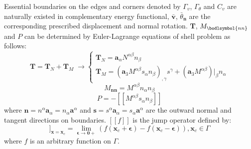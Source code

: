 Essential boundaries on the edges and corners denoted by $\Gamma_v$, $\Gamma_\theta$ and $C_v$ are naturally existed in complementary energy functional, $\bar{\boldsymbol v}$, $\bar \theta_{\boldsymbol n}$ are the corresponding prescribed displacement and normal rotation. $\boldsymbol T$, $M_{\bodlsymbol{nn}}$ and $P$ can be determined by Euler-Lagrange equations of shell problem \cite{benzaken2021} as follows:
\begin{equation}
\boldsymbol T = \boldsymbol T_N + \boldsymbol T_M \; \rightarrow
\begin{cases}
\boldsymbol T_N = \boldsymbol a_\alpha N^{\alpha\beta}n_\beta \\
\boldsymbol T_M = (\boldsymbol a_3 M^{\alpha\beta}s_\alpha n_\beta)_{,\gamma} s^\gamma
+ (\boldsymbol a_3 M^{\alpha\beta})\vert_\beta n_\alpha
\end{cases}
\end{equation}
\begin{equation}
M_{\boldsymbol{nn}} = M^{\alpha\beta}n_\alpha n_\beta
\end{equation}
\begin{equation}
P = -[[M^{\alpha\beta}s_\alpha n_\beta]]
\end{equation}
where $\boldsymbol n = n^\alpha \boldsymbol a_\alpha = n_\alpha \boldsymbol a^\alpha$ and $\boldsymbol s = s^\alpha \boldsymbol a_\alpha = s_\alpha \boldsymbol a^\alpha$ are the outward normal and tangent directions on boundaries. $[[f]]$ is the jump operator defined by:
\begin{equation}
[[f]]_{\boldsymbol x = \boldsymbol x_c} = \lim_{\boldsymbol \epsilon\rightarrow \boldsymbol 0+}(f(\boldsymbol x_c + \boldsymbol \epsilon) - f(\boldsymbol x_c - \boldsymbol \epsilon)), \boldsymbol x_c \in \Gamma
\end{equation}
where $f$ is an arbitrary function on $\Gamma$.

